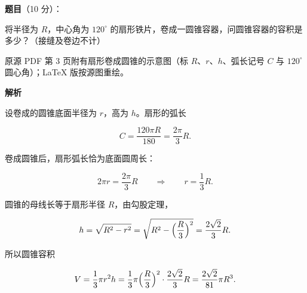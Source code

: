\begin{answer}

\textbf{题目}（10 分）：

将半径为 $R$，中心角为 $120^\circ$ 的扇形铁片，卷成一圆锥容器，问圆锥容器的容积是多少？（接缝及卷边不计）

\begin{gktip}
原源 PDF 第 3 页附有扇形卷成圆锥的示意图（标 $R$、$r$、$h$、弧长记号 $C$ 与 $120^\circ$ 圆心角）；LaTeX 版按源图重绘。
\end{gktip}
\nopagebreak[4]
\begin{center}\end{center}
\nopagebreak[4]
\textbf{解析}
\nopagebreak[4]
\begin{center}\end{center}
\nopagebreak[4]
设卷成的圆锥底面半径为 $r$，高为 $h$。扇形的弧长

\nopagebreak[4]
\[
C=\frac{120\pi R}{180}=\frac{2\pi}3R.
\]

卷成圆锥后，扇形弧长恰为底面圆周长：

\nopagebreak[4]
\[
2\pi r=\frac{2\pi}3R
\qquad\Longrightarrow\qquad
r=\frac13R.
\]

圆锥的母线长等于扇形半径 $R$，由勾股定理，

\nopagebreak[4]
\[
h=\sqrt{R^2-r^2}=\sqrt{R^2-\Bigl(\frac R3\Bigr)^2}
=\frac{2\sqrt2}3R.
\]

所以圆锥容积

\nopagebreak[4]
\[
V=\frac13\pi r^2h
=\frac13\pi\Bigl(\frac R3\Bigr)^2\cdot\frac{2\sqrt2}3R
=\frac{2\sqrt2}{81}\pi R^3.
\]


\end{answer}
